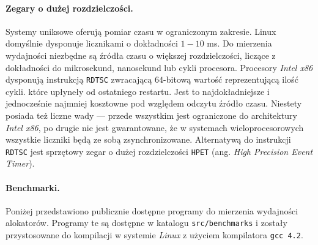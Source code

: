 \documentclass[12pt,a4paper,titlepage,twoside]{mwart}
\begin{document}
\paragraph{Zegary o dużej rozdzielczości.} Systemy uniksowe oferują pomiar
czasu w ograniczonym zakresie. Linux domyślnie dysponuje licznikami o
dokładności $1-10$ ms. Do mierzenia wydajności niezbędne są źródła czasu o
większej rozdzielczości, liczące z dokładności do mikrosekund, nanosekund lub
cykli procesora. Procesory \textit{Intel x86} dysponują instrukcją
\texttt{RDTSC} zwracającą $64$-bitową wartość reprezentującą ilość cykli.
które upłyneły od ostatniego restartu. Jest to najdokładniejsze i jednocześnie
najmniej kosztowne pod względem odczytu źródło czasu. Niestety posiada też
liczne wady --- przede wszystkim jest ograniczone do architektury \textit{Intel
x86}, po drugie nie jest gwarantowane, że w systemach wieloprocesorowych
wszystkie liczniki będą ze sobą zsynchronizowane. Alternatywą do instrukcji
\texttt{RDTSC} jest sprzętowy zegar o dużej rozdzielczości \texttt{HPET} (ang.
\textit{High Precision Event Timer}).

\paragraph{Benchmarki.} Poniżej przedstawiono publicznie dostępne programy do
mierzenia wydajności alokatorów. Programy te są dostępne w katalogu
\texttt{src/benchmarks} i zostały przystosowane do kompilacji w systemie
\textit{Linux} z użyciem kompilatora \texttt{gcc 4.2}.
\end{document}
